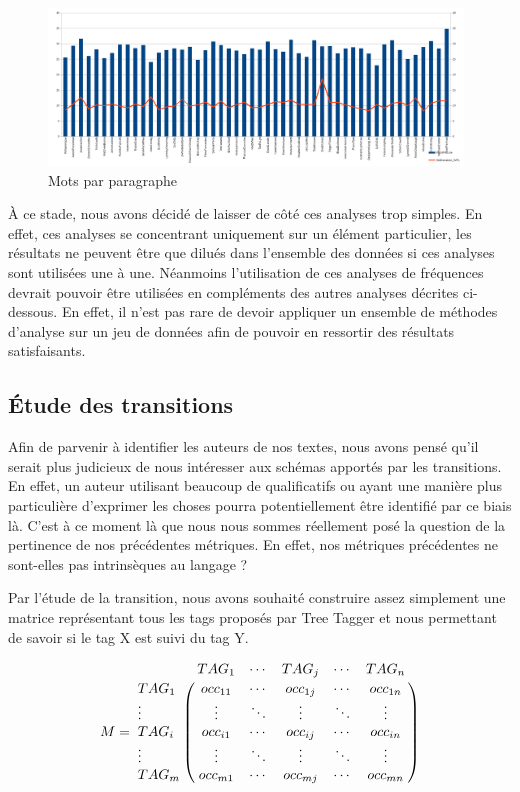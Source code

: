 \documentclass[a4paper,12pt]{report}
\begin{document}
\begin{figure}[hbtp]
\centering
\includegraphics[width=11cm]{fig/WPL.png}
\caption{Mots par paragraphe}
\label{WPL}
\end{figure}

À ce stade, nous avons décidé de laisser de côté ces analyses trop simples. En effet, ces analyses se concentrant uniquement sur un élément particulier, les résultats ne peuvent être que dilués dans l'ensemble des données si ces analyses sont utilisées une à une. Néanmoins l'utilisation de ces analyses de fréquences devrait pouvoir être utilisées en compléments des autres analyses décrites ci-dessous. En effet, il n'est pas rare de devoir appliquer un ensemble de méthodes d'analyse sur un jeu de données afin de pouvoir en ressortir des résultats satisfaisants.


\subsection{Étude des transitions}

Afin de parvenir à identifier les auteurs de nos textes, nous avons pensé qu'il serait plus judicieux de nous intéresser aux schémas apportés par les transitions. En effet, un auteur utilisant beaucoup de qualificatifs ou ayant une manière plus particulière d'exprimer les choses pourra potentiellement être identifié par ce biais là. C'est à ce moment là que nous nous sommes réellement posé la question de la pertinence de nos précédentes métriques. En effet, nos métriques précédentes ne sont-elles pas intrinsèques au langage ?

Par l'étude de la transition, nous avons souhaité construire assez simplement une matrice représentant tous les tags proposés par Tree Tagger et nous permettant de savoir si le tag X est suivi du tag Y.

\[M=\bordermatrix{
&TAG_{1}&\cdots&TAG_{j}&\cdots&TAG_{n}\cr
TAG_{1}& occ_{11} & \cdots & occ_{1j} & \cdots & occ_{1n} \cr
\vdots&\vdots&\ddots&\vdots&\ddots&\vdots\cr
TAG_{i}& occ_{i1} & \cdots & occ_{ij} & \cdots & occ_{in} \cr
\vdots&\vdots&\ddots&\vdots&\ddots&\vdots\cr
TAG_{m}& occ_{m1} & \cdots & occ_{mj} & \cdots & occ_{mn} \cr
}\]
\end{document}
